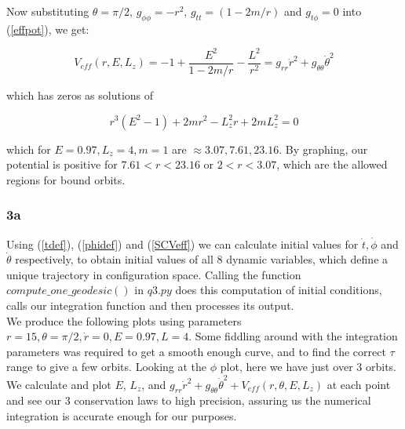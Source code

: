 \documentclass[10pt,a4paper]{report}
\begin{document}
\normalsize
Now substituting $\theta=\pi/2$, $g_{\phi\phi} = -r^2$, $g_{tt}=(1-2m/r)$ and $g_{t\phi} = 0$ into (\ref{effpot}), we get:

\begin{equation}
V_{eff}(r, E, L_z) = -1 + \frac{E^2}{1-2m/r} - \frac{L^2}{r^2} = g_{rr}\dot{r}^2+g_{\theta\theta}\dot{\theta}^2
\label{SCVeff}
\end{equation}

which has zeros as solutions of 

\begin{equation*}
r^3(E^2-1) + 2mr^2 -L_z^2r+2mL_z^2=0
\end{equation*}

which for $E=0.97, L_z=4, m=1$ are $\approx 3.07, 7.61, 23.16$. By graphing, our potential is positive for $7.61<r<23.16$ or $2<r<3.07$, which are the allowed regions for bound orbits.




\subsubsection*{3a}

Using (\ref{tdef}), (\ref{phidef}) and (\ref{SCVeff}) we can calculate initial values for $\dot{t}, \dot{\phi}$ and $\dot{\theta}$ respectively, to obtain initial values of all 8 dynamic variables, which define a unique trajectory in configuration space. Calling the function $compute\_one\_geodesic()$ in $q3.py$ does this computation of initial conditions, calls our integration function and then processes its output. \\

We produce the following plots using parameters $r=15, \theta=\pi/2, \dot{r}=0, E=0.97, L=4$. Some fiddling around with the integration parameters was required to get a smooth enough curve, and to find the correct $\tau$ range to give a few orbits. Looking at the $\phi$ plot, here we have just over 3 orbits. We calculate and plot $E$, $L_z$, and $g_{rr}\dot{r}^2+g_{\theta\theta}\dot{\theta}^2 + V_{eff}(r, \theta, E, L_z)$ at each point and see our 3 conservation laws to high precision, assuring us the numerical integration is accurate enough for our purposes.
\end{document}
